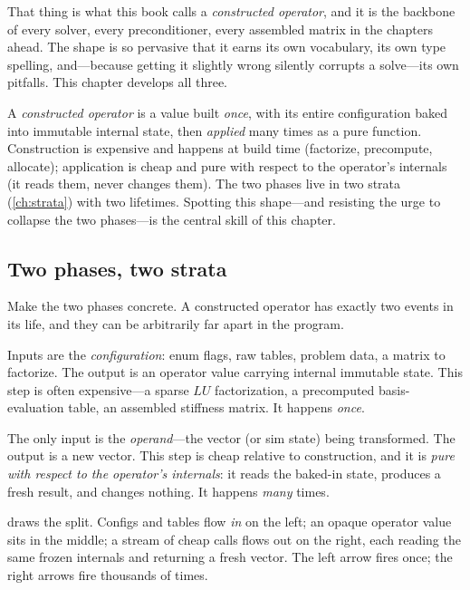 That thing is what this book calls a \emph{constructed operator}, and it is the
backbone of every solver, every preconditioner, every assembled matrix in the
chapters ahead. The shape is so pervasive that it earns its own vocabulary, its own
type spelling, and---because getting it slightly wrong silently corrupts a
solve---its own pitfalls. This chapter develops all three.

\begin{keyidea}
A \emph{constructed operator} is a value built \emph{once}, with its entire
configuration baked into immutable internal state, then \emph{applied} many times as
a pure function. Construction is expensive and happens at build time (factorize,
precompute, allocate); application is cheap and pure with respect to the operator's
internals (it reads them, never changes them). The two phases live in two strata
(\cref{ch:strata}) with two lifetimes. Spotting this shape---and resisting the urge
to collapse the two phases---is the central skill of this chapter.
\end{keyidea}

\subsection{Two phases, two strata}

Make the two phases concrete. A constructed operator has exactly two events in its
life, and they can be arbitrarily far apart in the program.

\begin{description}[style=nextline,leftmargin=1.5em]
  \item[Construction.] Inputs are the \emph{configuration}: enum flags, raw tables,
  problem data, a matrix to factorize. The output is an operator value carrying
  internal immutable state. This step is often expensive---a sparse $LU$
  factorization, a precomputed basis-evaluation table, an assembled stiffness
  matrix. It happens \emph{once}.
  \item[Application.] The only input is the \emph{operand}---the vector (or sim
  state) being transformed. The output is a new vector. This step is cheap relative
  to construction, and it is \emph{pure with respect to the operator's internals}:
  it reads the baked-in state, produces a fresh result, and changes nothing. It
  happens \emph{many} times.
\end{description}

 draws the split. Configs and tables flow \emph{in} on the
left; an opaque operator value sits in the middle; a stream of cheap
 calls flows out on the right, each reading the same frozen internals
and returning a fresh vector. The left arrow fires once; the right arrows fire
thousands of times.

